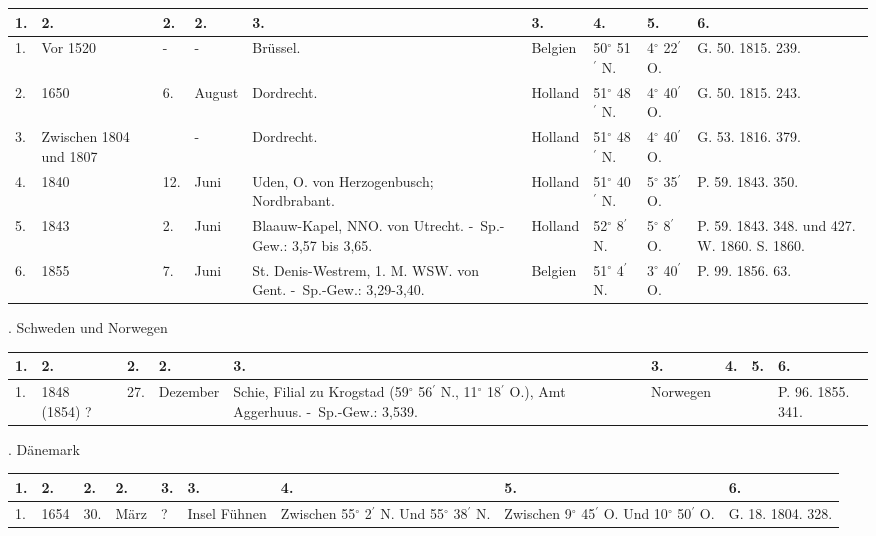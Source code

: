 \documentclass[a4paper, 11pt, oneside, polutonikogreek, german]{article}
\begin{document}
\begin{table}[!ht]
    \centering
    \begin{tabular}{|l|l|l|l|l|l|l|l|l|}
    \hline
        1. & 2. & 2. & 2. & 3. & 3. & 4. & 5. & 6. \\ \hline
        1. & Vor 1520 & - & - & Brüssel. & Belgien & 50$^\circ$ 51$^\prime$ N. & 4$^\circ$ 22$^\prime$ O. & G. 50. 1815. 239. \\ \hline
        2. & 1650 & 6. & August & Dordrecht. & Holland & 51$^\circ$ 48$^\prime$ N. & 4$^\circ$ 40$^\prime$ O. & G. 50. 1815. 243. \\ \hline
        3. & Zwischen 1804 und 1807 & ~ & - & Dordrecht. & Holland & 51$^\circ$ 48$^\prime$ N. & 4$^\circ$ 40$^\prime$ O. & G. 53. 1816. 379. \\ \hline
        4. & 1840 & 12. & Juni & Uden, O. von Herzogenbusch; Nordbrabant. & Holland & 51$^\circ$ 40$^\prime$ N. & 5$^\circ$ 35$^\prime$ O. & P. 59. 1843. 350. \\ \hline
        5. & 1843 & 2. & Juni & Blaauw-Kapel, NNO. von Utrecht. - Sp.-Gew.: 3,57 bis 3,65. & Holland & 52$^\circ$ 8$^\prime$ N. & 5$^\circ$ 8$^\prime$ O. & P. 59. 1843. 348. und 427. W. 1860. S. 1860. \\ \hline
        6. & 1855 & 7. & Juni & St. Denis-Westrem, 1. M. WSW. von Gent. - Sp.-Gew.: 3,29-3,40. & Belgien & 51$^\circ$ 4$^\prime$ N. & 3$^\circ$ 40$^\prime$ O. & P. 99. 1856. 63. \\ \hline
    \end{tabular}
\end{table}
. Schweden und Norwegen
\begin{table}[!ht]
    \centering
    \begin{tabular}{|l|l|l|l|l|l|l|l|l|}
    \hline
        1. & 2. & 2. & 2. & 3. & 3. & 4. & 5. & 6. \\ \hline
        1. & 1848 (1854) ? & 27. & Dezember & Schie, Filial zu Krogstad (59$^\circ$ 56$^\prime$ N., 11$^\circ$ 18$^\prime$ O.), Amt Aggerhuus. - Sp.-Gew.: 3,539. & Norwegen & ~ & ~ & P. 96. 1855. 341. \\ \hline
    \end{tabular}
\end{table}
. Dänemark
\begin{table}[!ht]
    \centering
    \begin{tabular}{|l|l|l|l|l|l|l|l|l|}
    \hline
        1. & 2. & 2. & 2. & 3. & 3. & 4. & 5. & 6. \\ \hline
        1. & 1654 & 30. & März & ? & Insel Fühnen & Zwischen 55$^\circ$ 2$^\prime$ N. Und 55$^\circ$ 38$^\prime$ N. & Zwischen 9$^\circ$ 45$^\prime$ O. Und 10$^\circ$ 50$^\prime$ O. & G. 18. 1804. 328. \\ \hline
    \end{tabular}
\end{table}
\end{document}
